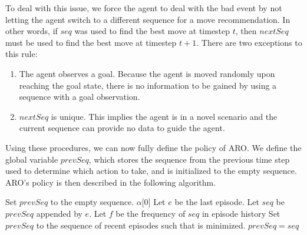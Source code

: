 \documentclass[letterpaper]{article} %
\begin{document}
To deal with this issue, we force the agent to deal with the bad event
by not letting the agent switch to a different sequence for a move
recommendation. In other words, if $seq$ was used to find the best
move at timestep $t$, then $nextSeq$ must be used to find the best
move at timestep $t+1$. There are two exceptions to this rule:
\begin{enumerate}
	\item The agent observes a goal. Because the agent is moved randomly upon reaching the goal state, there is no information to be gained by using a sequence with a goal observation.
	\item $nextSeq$ is unique. This implies the agent is in a novel scenario and the current sequence can provide no data to guide the agent.
\end{enumerate}

Using these procedures, we can now fully define the policy of ARO. We
define the global variable $prevSeq$, which stores the sequence
from the previous time step used to determine which action to take,
and is initialized to the empty sequence. ARO's policy is then
described in the following algorithm.

\begin{algorithmic}[1]
			\State Set $prevSeq$ to the empty sequence.
			\State \Return $\alpha$[0]
		\EndIf
		\State Let $e$ be the last episode.
		\State Let $seq$ be $prevSeq$ appended by $e$.
		\State Let $f$ be the frequency of $seq$ in episode history
			\State Set $prevSeq$ to the sequence of recent episodes such that  is minimized.
		\Else
			\State $prevSeq = seq$
		\EndIf
        \State \Return {}
	\EndFunction
	
\end{algorithmic}

\end{document}
